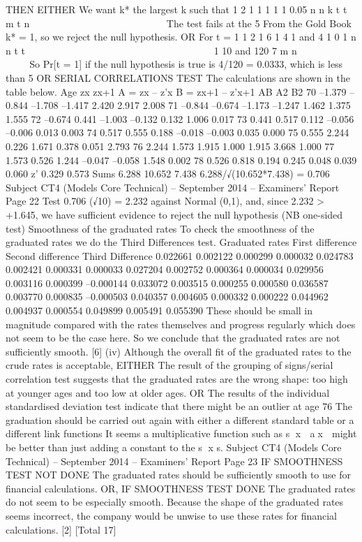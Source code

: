 \documentclass[a4paper,12pt]{article}
\begin{document}
THEN EITHER
We want k* the largest k such that
1 2
1
1 1
1
1
0.05
n n
k
t t
m
t n
    
      
 
  
 
 
The test fails at the 5%
From the Gold Book k* = 1, so we reject the null hypothesis.
OR
For t = 1
1 2 1 6 1 4
1 and 4
1 0 1
n n
t t
         
                     1
10
and 120
7
m
n
   
     
   
So Pr[t = 1] if the null hypothesis is true is
4/120 = 0.0333, which is less than 5%
OR SERIAL CORRELATIONS TEST
The calculations are shown in the table below.
Age zx zx+1 A = zx – z'x B = zx+1 – z'x+1 AB A2 B2
70 –1.379 –0.844 –1.708 –1.417 2.420 2.917 2.008
71 –0.844 –0.674 –1.173 –1.247 1.462 1.375 1.555
72 –0.674 0.441 –1.003 –0.132 0.132 1.006 0.017
73 0.441 0.517 0.112 –0.056 –0.006 0.013 0.003
74 0.517 0.555 0.188 –0.018 –0.003 0.035 0.000
75 0.555 2.244 0.226 1.671 0.378 0.051 2.793
76 2.244 1.573 1.915 1.000 1.915 3.668 1.000
77 1.573 0.526 1.244 –0.047 –0.058 1.548 0.002
78 0.526 0.818 0.194 0.245 0.048 0.039 0.060
z' 0.329 0.573 Sums 6.288 10.652 7.438
6.288/√(10.652*7.438) = 0.706
Subject CT4 (Models Core Technical) – September 2014 – Examiners’ Report
Page 22
Test 0.706 (√10) = 2.232 against Normal (0,1), and, since
2.232 > +1.645, we have sufficient evidence to reject the null hypothesis (NB
one-sided test)
Smoothness of the graduated rates
To check the smoothness of the graduated rates we do the Third Differences
test.
Graduated rates First difference Second
difference
Third Difference
0.022661 0.002122 0.000299 0.000032
0.024783 0.002421 0.000331 0.000033
0.027204 0.002752 0.000364 0.000034
0.029956 0.003116 0.000399 –0.000144
0.033072 0.003515 0.000255 0.000580
0.036587 0.003770 0.000835 –0.000503
0.040357 0.004605 0.000332 0.000222
0.044962 0.004937 0.000554
0.049899 0.005491
0.055390
These should be small in magnitude compared with the rates themselves and
progress regularly which does not seem to be the case here.
So we conclude that the graduated rates are not sufficiently smooth. [6]
(iv) Although the overall fit of the graduated rates to the crude rates is
acceptable,
EITHER
The result of the grouping of signs/serial correlation test suggests that the
graduated rates are the wrong shape: too high at younger ages and too low at
older ages.
OR
The results of the individual standardised deviation test indicate that there
might be an outlier at age 76
The graduation should be carried out again with either a different standard
table or a different link functions
It seems a multiplicative function such as s
x  ax  might be better than just
adding a constant to the s
x s.
Subject CT4 (Models Core Technical) – September 2014 – Examiners’ Report
Page 23
IF SMOOTHNESS TEST NOT DONE
The graduated rates should be sufficiently smooth to use for financial
calculations.
OR, IF SMOOTHNESS TEST DONE
The graduated rates do not seem to be especially smooth.
Because the shape of the graduated rates seems incorrect, the company
would be unwise to use these rates for financial calculations. [2]
[Total 17]
\end{document}
